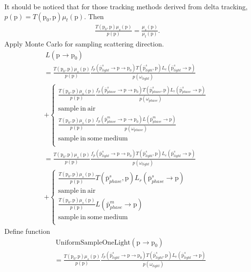 \documentclass[acmtog]{acmart}
\def\w{\omega}
\def\p{\mathrm{p}}
\def\pp#1#2{\p_{#1}\rightarrow\p_{#2}}
\begin{document}
It should be noticed that for those tracking methods derived from delta tracking, $p({\p})=T(\p_0,\p)\mu_t(\p)$. Then
\begin{equation} \label{eq14}
	\begin{split}
		\frac{T(\p_0,\p)\mu_s(\p)}{p({\p})} = \frac{\mu_s(\p)}{\mu_t(\p)}.
	\end{split}
\end{equation}
Apply Monte Carlo for sampling scattering direction.
\begin{equation} \label{eq15}
	\begin{split}
		&\ L(\pp{}{0})\\
		&= \frac{T(\p_0,\p)\mu_s(\p)}{p({\p})} \frac{f_p(\bar{\p}^s_{light}\rightarrow\p\rightarrow\p_0)T(\bar{\p}^s_{light},\p)L_e(\bar{\p}^s_{light}\rightarrow\p)}{p(\w_{light})}\\
		&+ \left\{\begin{aligned}
			\frac{T(\p_0,\p)\mu_s(\p)}{p({\p})} \frac{f_p(\bar{\p}^s_{phase}\rightarrow\p\rightarrow\p_0)T(\bar{\p}^s_{phase},\p)L_r(\bar{\p}^s_{phase}\rightarrow\p)}{p(\w_{phase})}\\
			\mathrm{sample\ in\ air}\\
			\frac{T(\p_0,\p)\mu_s(\p)}{p({\p})} \frac{f_p(\bar{\p}^m_{phase}\rightarrow\p\rightarrow\p_0)L(\bar{\p}^m_{phase}\rightarrow\p)}{p(\w_{phase})}\quad\quad\quad\quad\quad\ \ \\
			\mathrm{sample\ in\ some\ medium}\\
		\end{aligned}\right.\\
		&= \frac{T(\p_0,\p)\mu_s(\p)}{p({\p})} \frac{f_p(\bar{\p}^s_{light}\rightarrow\p\rightarrow\p_0)T(\bar{\p}^s_{light},\p)L_e(\bar{\p}^s_{light}\rightarrow\p)}{p(\w_{light})}\\
		&+ \left\{\begin{aligned}
			\frac{T(\p_0,\p)\mu_s(\p)}{p({\p})} T(\bar{\p}^s_{phase},\p)L_r(\bar{\p}^s_{phase}\rightarrow\p)\\
			\mathrm{sample\ in\ air}\\
			\frac{T(\p_0,\p)\mu_s(\p)}{p({\p})} L(\bar{\p}^m_{phase}\rightarrow\p)\quad\quad\quad\quad\quad\ \ \\
			\mathrm{sample\ in\ some\ medium}\\
		\end{aligned}\right.
	\end{split}
\end{equation}
Define function
\begin{equation} \label{eq16}
	\begin{split}
		&\ \mathrm{UniformSampleOneLight}(\pp{}{0})\\
		&= \frac{T(\p_0,\p)\mu_s(\p)}{p({\p})} \frac{f_p(\bar{\p}^s_{light}\rightarrow\p\rightarrow\p_0)T(\bar{\p}^s_{light},\p)L_e(\bar{\p}^s_{light}\rightarrow\p)}{p(\w_{light})}
	\end{split}
\end{equation}
\end{document}
